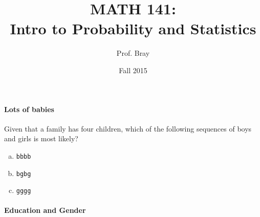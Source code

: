 \documentclass[10pt]{article}
\title{MATH 141:\\Intro to Probability and Statistics}
\author{Prof. Bray}
\date{Fall 2015}
\begin{document}


\paragraph{Lots of babies}

Given that a family has four children, which of the following sequences of boys
and girls is most likely?
\begin{enumerate}[(a)]
\item \texttt{bbbb}
\vspace{7mm}
\item \texttt{bgbg}
\vspace{7mm}
\item \texttt{gggg}
\vspace{7mm}
\end{enumerate}


\paragraph{Education and Gender}
\end{document}
